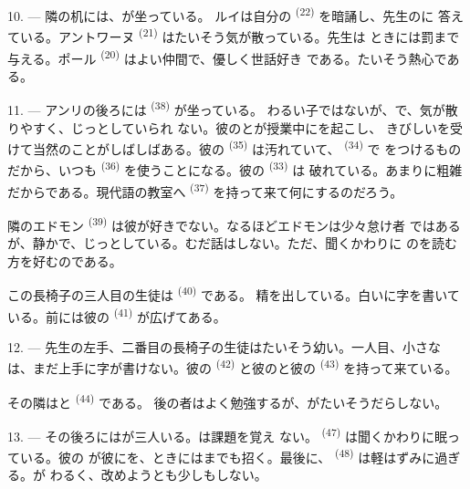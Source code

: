10. --- 隣の机には、が坐っている。
ルイは自分の \textsuperscript{(22)} を暗誦し、先生のに
答えている。アントワーヌ \textsuperscript{(21)} はたいそう気が散っている。先生は
ときには罰まで与える。ポール \textsuperscript{(20)} はよい仲間で、優しく世話好き
である。たいそう熱心である。

\VUsaut{4.2mm}
\VUsaut{3.2mm}

11. --- アンリの後ろには \textsuperscript{(38)} が坐っている。
わるい子ではないが、で、気が散りやすく、じっとしていられ
ない。彼のとが授業中にを起こし、
きびしいを受けて当然のことがしばしばある。彼の
\textsuperscript{(35)} は汚れていて、 \textsuperscript{(34)} で
をつけるものだから、いつも
\textsuperscript{(36)} を使うことになる。彼の \textsuperscript{(33)} は
破れている。あまりに粗雑だからである。現代語の教室へ
\textsuperscript{(37)} を持って来て何にするのだろう。

隣のエドモン \textsuperscript{(39)} は彼が好きでない。なるほどエドモンは少々怠け者
ではあるが、静かで、じっとしている。むだ話はしない。ただ、聞くかわりに
のを読む方を好むのである。

この長椅子の三人目の生徒は \textsuperscript{(40)} である。
精を出している。白いに字を書いている。前には彼の
\textsuperscript{(41)} が広げてある。

12. --- 先生の左手、二番目の長椅子の生徒はたいそう幼い。一人目、小さな
は、まだ上手に字が書けない。彼の
\textsuperscript{(42)} と彼のと彼の \textsuperscript{(43)}
を持って来ている。

その隣はと \textsuperscript{(44)} である。
後の者はよく勉強するが、がたいそうだらしない。

13. --- その後ろにはが三人いる。は課題を覚え
ない。 \textsuperscript{(47)} は聞くかわりに眠っている。彼の
が彼にを、ときにはまでも招く。最後に、
 \textsuperscript{(48)} は軽はずみに過ぎる。が
わるく、改めようとも少しもしない。

